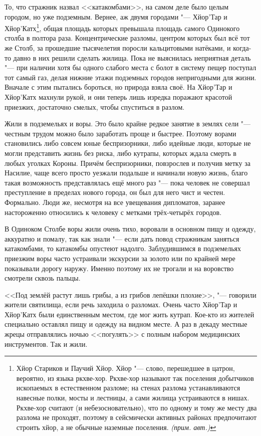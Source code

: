 \documentclass[a4paper,10pt,fleqn]{book}
\newcommand{\authornote}{\textit{(прим. авт.)}}
\begin{document}
То, что стражник назвал <<катакомбами>>, на самом деле было целым городом, но уже подземным.
Вернее, аж двумя городами "--- Хйор'Тар и Хйор'Катх\footnote
{Хйор Стариков и Паучий Хйор.
Хйор "--- слово, перешедшее в цатрон, вероятно, из языка ркхве-хор.
Ркхве-хор называют так поселения добытчиков ископаемых в естественном разломе;
на стенах разлома устанавливаются навесные полки, мосты и лестницы, а сами жилища устраиваются в нишах.
Ркхве-хор считают (и небезосновательно), что по одному и тому же месту два разлома не проходят, поэтому в сейсмически активных районах предпочитают строить хйор, а не обычные наземные поселения. \authornote},
общая площадь которых превышала площадь самого Одинокого столба в полтора раза.
Концентрические разломы, центром которых был всё тот же Столб, за прошедшие тысячелетия поросли кальцитовыми натёками, и когда-то давно в них решили сделать жилища.
Пока не выяснилась неприятная деталь "--- при наличии хотя бы одного слабого места с болот в систему пещер поступал тот самый газ, делая нижние этажи подземных городов непригодными для жизни.
Вначале с этим пытались бороться, но природа взяла своё.
На Хйор'Тар и Хйор'Катх махнули рукой, и они теперь лишь изредка поражают красотой приезжих, достаточно смелых, чтобы спуститься в разлом.

Жили в подземельях и воры.
Это было крайне редкое занятие в землях сели "--- честным трудом можно было заработать проще и быстрее.
Поэтому ворами становились либо совсем юные беспризорники, либо идейные люди, которые не могли представить жизнь без риска, либо кутрапы, которых ждала смерть в любых уголках Короны.
Причём беспризорники, повзрослев и получив метку за Насилие, чаще всего просто уезжали подальше и начинали новую жизнь, благо такая возможность представлялась ещё много раз "--- пока человек не совершал преступление в пределах нового города, он был для него чист и честен.
Формально.
Люди же, несмотря на все увещевания дипломатов, заранее настороженно относились к человеку с метками трёх-четырёх городов.

В Одиноком Столбе воры жили очень тихо, воровали в основном пищу и одежду, аккуратно и помалу, так как знали "--- если дать повод стражникам заняться катакомбами, то катакомбы опустеют надолго.
Заблудившимся в подземельях приезжим воры часто устраивали экскурсии за золото или по крайней мере показывали дорогу наружу.
Именно поэтому их не трогали и на воровство смотрели сквозь пальцы.

<<Под землёй растут лишь грибы, а из грибов лепёшки плохие>>, "--- говорили жители святилища, если речь заходила о разломах.
Очень часто Хйор'Тар и Хйор'Катх были единственным местом, где мог жить кутрап.
Кое-кто из жителей специально оставлял пищу и одежду на видном месте.
А раз в декаду местные жрецы отправлялись ночью <<погулять>> с полным набором медицинских инструментов.
Так и жили.
\end{document}
